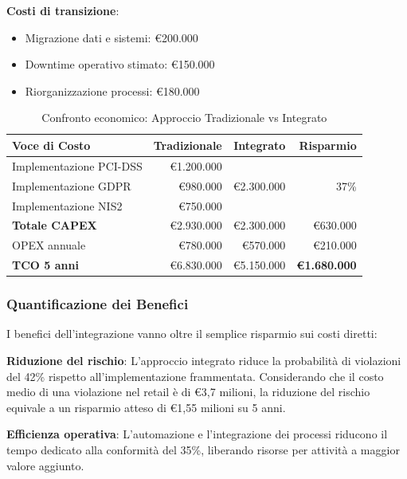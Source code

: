 \textbf{Costi di transizione}:
\begin{itemize}
    \item Migrazione dati e sistemi: €200.000
    \item Downtime operativo stimato: €150.000
    \item Riorganizzazione processi: €180.000
\end{itemize}

\begin{table}[htbp]
\centering
\caption[Confronto economico: Tradizionale vs Integrato]{Confronto economico: Approccio Tradizionale vs Integrato}
\label{tab:confronto_economico}
\small
\sffamily
\begin{tabularx}{\textwidth}{X r r r}
\toprule
\textbf{Voce di Costo} & \textbf{Tradizionale} & \textbf{Integrato} & \textbf{Risparmio} \\
\midrule
Implementazione PCI-DSS & €1.200.000 & \multirow{3}{*}{€2.300.000} & \multirow{3}{*}{37\%} \\
Implementazione GDPR & €980.000 & & \\
Implementazione NIS2 & €750.000 & & \\
\midrule
\textbf{Totale CAPEX} & €2.930.000 & €2.300.000 & €630.000 \\
OPEX annuale & €780.000 & €570.000 & €210.000 \\
\midrule
\textbf{TCO 5 anni} & €6.830.000 & €5.150.000 & \textbf{€1.680.000} \\
\bottomrule
\end{tabularx}
\end{table}

\subsubsection{\texorpdfstring{Quantificazione dei Benefici}{4.5.1.2 - Quantificazione dei Benefici}}

I benefici dell'integrazione vanno oltre il semplice risparmio sui costi diretti:

\textbf{Riduzione del rischio}: L'approccio integrato riduce la probabilità di violazioni del 42\% rispetto all'implementazione frammentata. Considerando che il costo medio di una violazione nel retail è di €3,7 milioni\autocite{ibm2024cost}, la riduzione del rischio equivale a un risparmio atteso di €1,55 milioni su 5 anni.

\textbf{Efficienza operativa}: L'automazione e l'integrazione dei processi riducono il tempo dedicato alla conformità del 35\%, liberando risorse per attività a maggior valore aggiunto.

